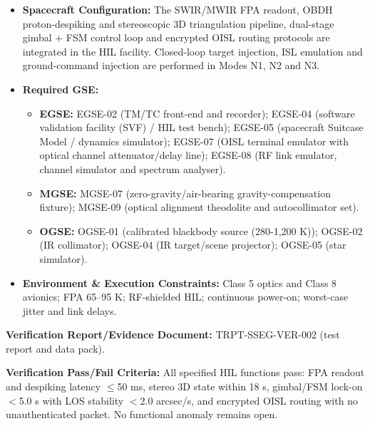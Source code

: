 \begin{itemize}
\item \textbf{Spacecraft Configuration:} The SWIR/MWIR FPA readout, OBDH proton-despiking and stereoscopic 3D triangulation pipeline, dual-stage gimbal + FSM control loop and encrypted OISL routing protocols are integrated in the HIL facility. Closed-loop target injection, ISL emulation and ground-command injection are performed in Modes N1, N2 and N3.
\item \textbf{Required GSE:}
\begin{itemize}
\item \textbf{EGSE:} EGSE-02 (TM/TC front-end and recorder); EGSE-04 (software validation facility (SVF) / HIL test bench); EGSE-05 (spacecraft Suitcase Model / dynamics simulator); EGSE-07 (OISL terminal emulator with optical channel attenuator/delay line); EGSE-08 (RF link emulator, channel simulator and spectrum analyser).
\item \textbf{MGSE:} MGSE-07 (zero-gravity/air-bearing gravity-compensation fixture); MGSE-09 (optical alignment theodolite and autocollimator set).
\item \textbf{OGSE:} OGSE-01 (calibrated blackbody source (280-1,200 K)); OGSE-02 (IR collimator); OGSE-04 (IR target/scene projector); OGSE-05 (star simulator).
\end{itemize}
\item \textbf{Environment \& Execution Constraints:} Class 5 optics and Class 8 avionics; FPA 65--95 K; RF-shielded HIL; continuous power-on; worst-case jitter and link delays.
\end{itemize}
\par\textbf{Verification Report/Evidence Document:} TRPT-SSEG-VER-002 (test report and data pack).
\par\textbf{Verification Pass/Fail Criteria:} All specified HIL functions pass: FPA readout and despiking latency $\le$50 ms, stereo 3D state within 18 s, gimbal/FSM lock-on $<$5.0 s with LOS stability $<$2.0 arcsec/s, and encrypted OISL routing with no unauthenticated packet. No functional anomaly remains open.
\par\medskip
